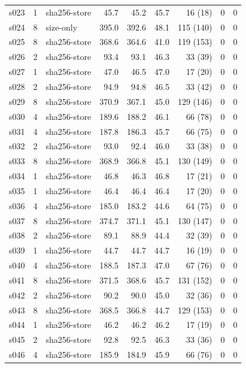 \begin{tabular}{@{}lrlrrrrrr@{}}
s023 & 1 & sha256-store & 45.7 & 45.2 & 45.7 & 16 (18) & 0 & 0 \\
s024 & 8 & size-only & 395.0 & 392.6 & 48.1 & 115 (140) & 0 & 0 \\
s025 & 8 & sha256-store & 368.6 & 364.6 & 41.0 & 119 (153) & 0 & 0 \\
s026 & 2 & sha256-store & 93.4 & 93.1 & 46.3 & 33 (39) & 0 & 0 \\
s027 & 1 & sha256-store & 47.0 & 46.5 & 47.0 & 17 (20) & 0 & 0 \\
s028 & 2 & sha256-store & 94.9 & 94.8 & 46.5 & 33 (42) & 0 & 0 \\
s029 & 8 & sha256-store & 370.9 & 367.1 & 45.0 & 129 (146) & 0 & 0 \\
s030 & 4 & sha256-store & 189.6 & 188.2 & 46.1 & 66 (78) & 0 & 0 \\
s031 & 4 & sha256-store & 187.8 & 186.3 & 45.7 & 66 (75) & 0 & 0 \\
s032 & 2 & sha256-store & 93.0 & 92.4 & 46.0 & 33 (38) & 0 & 0 \\
s033 & 8 & sha256-store & 368.9 & 366.8 & 45.1 & 130 (149) & 0 & 0 \\
s034 & 1 & sha256-store & 46.8 & 46.3 & 46.8 & 17 (21) & 0 & 0 \\
s035 & 1 & sha256-store & 46.4 & 46.4 & 46.4 & 17 (20) & 0 & 0 \\
s036 & 4 & sha256-store & 185.0 & 183.2 & 44.6 & 64 (75) & 0 & 0 \\
s037 & 8 & sha256-store & 374.7 & 371.1 & 45.1 & 130 (147) & 0 & 0 \\
s038 & 2 & sha256-store & 89.1 & 88.9 & 44.4 & 32 (39) & 0 & 0 \\
s039 & 1 & sha256-store & 44.7 & 44.7 & 44.7 & 16 (19) & 0 & 0 \\
s040 & 4 & sha256-store & 188.5 & 187.3 & 47.0 & 67 (76) & 0 & 0 \\
s041 & 8 & sha256-store & 371.5 & 368.6 & 45.7 & 131 (152) & 0 & 0 \\
s042 & 2 & sha256-store & 90.2 & 90.0 & 45.0 & 32 (36) & 0 & 0 \\
s043 & 8 & sha256-store & 368.5 & 366.8 & 44.7 & 129 (153) & 0 & 0 \\
s044 & 1 & sha256-store & 46.2 & 46.2 & 46.2 & 17 (19) & 0 & 0 \\
s045 & 2 & sha256-store & 92.8 & 92.5 & 46.3 & 33 (36) & 0 & 0 \\
s046 & 4 & sha256-store & 185.9 & 184.9 & 45.9 & 66 (76) & 0 & 0 \\
\bottomrule
\end{tabular}
